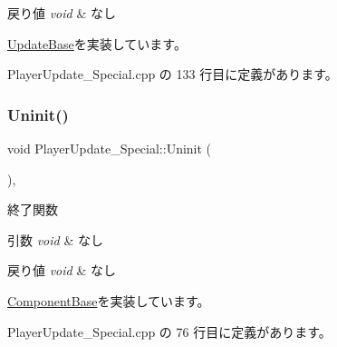 \begin{DoxyRetVals}{戻り値}
{\em void} & なし \\
\hline
\end{DoxyRetVals}


\mbox{\hyperlink{class_update_base_afc4956f78135aed5fc4e4f9991be50b9}{Update\+Base}}を実装しています。



 Player\+Update\+\_\+\+Special.\+cpp の 133 行目に定義があります。

\mbox{\label{class_player_update___special_a60b5982ed56b52293a9e651ae7bf305f}} 
\subsubsection{\texorpdfstring{Uninit()}{Uninit()}}
{\footnotesize\ttfamily void Player\+Update\+\_\+\+Special\+::\+Uninit (\begin{DoxyParamCaption}{ }\end{DoxyParamCaption})\hspace{0.3cm}{\ttfamily [override]}, {\ttfamily [virtual]}}



終了関数 


\begin{DoxyParams}{引数}
{\em void} & なし \\
\hline
\end{DoxyParams}

\begin{DoxyRetVals}{戻り値}
{\em void} & なし \\
\hline
\end{DoxyRetVals}


\mbox{\hyperlink{class_component_base_a9f42beaf0383d6f629819579cab4de57}{Component\+Base}}を実装しています。



 Player\+Update\+\_\+\+Special.\+cpp の 76 行目に定義があります。

\mbox{\label{class_player_update___special_afef3503e292dbaded809068fd87deadd}} 
